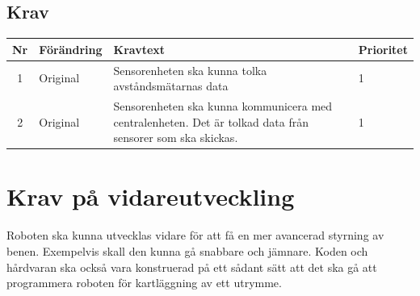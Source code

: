 \documentclass[a4paper,titlepage,12pt]{article}
\begin{document}
	\subsection{Krav}
	\begin{table}[h]
		\label{tab:label}
		\begin{tabularx}{\textwidth}{|c|l|X|l|}
			\hline
			\textbf{Nr} & \textbf{Förändring} & \textbf{Kravtext} & \textbf{Prioritet} 
				\\ \hline

			1 & Original & Sensorenheten ska kunna tolka avståndsmätarnas data & 1
				\\ \hline

			2 & Original & Sensorenheten ska kunna kommunicera med centralenheten. Det är 
				tolkad data från sensorer som ska skickas.& 1
				\\ \hline

		\end{tabularx}
	\end{table}



	\section{Krav på vidareutveckling}
	Roboten ska kunna utvecklas vidare för att få en mer avancerad styrning av benen. 
	Exempelvis skall den kunna gå snabbare och jämnare. Koden och hårdvaran ska också vara
	konstruerad på ett sådant sätt att det ska gå att programmera roboten för
	kartläggning av ett utrymme.
\end{document}
